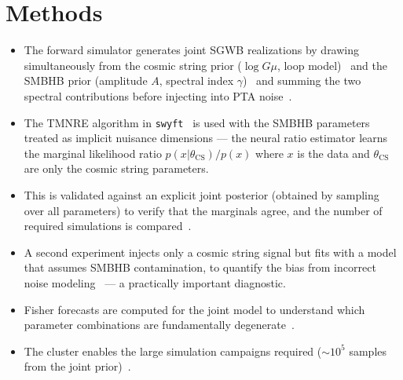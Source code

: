 \section{Methods}\label{sec:4-methods}
\begin{itemize}
    \item The forward simulator generates joint SGWB realizations by drawing simultaneously from the cosmic string prior ($\log G\mu$, loop model)~\cite{martins_extending_2002,blanco-pillado_number_2014,lorenz_cosmic_2010} and the SMBHB prior (amplitude $A$, spectral index $\gamma$)~\cite{sesana_insights_2013} and summing the two spectral contributions before injecting into PTA noise~\cite{johnson_nanograv_2024}.
    \item The TMNRE algorithm in \texttt{swyft}~\cite{miller_truncated_2021,miller_swyft_2022} is used with the SMBHB parameters treated as implicit nuisance dimensions — the neural ratio estimator learns the marginal likelihood ratio $p(x|\theta_\mathrm{CS})/p(x)$ where $x$ is the data and $\theta_\mathrm{CS}$ are only the cosmic string parameters.
    \item This is validated against an explicit joint posterior (obtained by sampling over all parameters) to verify that the marginals agree, and the number of required simulations is compared~\cite{alvey_simulationbased_2024}.
    \item A second experiment injects only a cosmic string signal but fits with a model that assumes SMBHB contamination, to quantify the bias from incorrect noise modeling~\cite{aggarwal_nanograv_2020} — a practically important diagnostic.
    \item Fisher forecasts are computed for the joint model to understand which parameter combinations are fundamentally degenerate~\cite{sesana_insights_2013}.
    \item The cluster enables the large simulation campaigns required (${\sim}10^5$ samples from the joint prior)~\cite{cranmer_frontier_2020}.
\end{itemize}